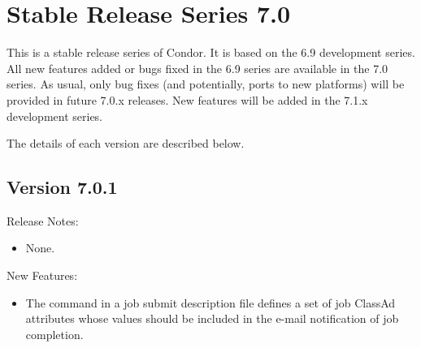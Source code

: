 
\section{\label{sec:History-7-0}Stable Release Series 7.0}

This is a stable release series of Condor.
It is based on the 6.9 development series.
All new features added or bugs fixed in the 6.9 series are available
in the 7.0 series.
As usual, only bug fixes (and potentially, ports to new platforms)
will be provided in future 7.0.x releases.
New features will be added in the 7.1.x development series.

The details of each version are described below.


\subsection*{\label{sec:New-7-0-1}Version 7.0.1}

\noindent Release Notes:

\begin{itemize}

\item None.

\end{itemize}


\noindent New Features:

\begin{itemize}

\item The command  in a job submit
description file defines a set of job ClassAd attributes whose values
should be included in the e-mail notification of job completion.

\end{itemize}

